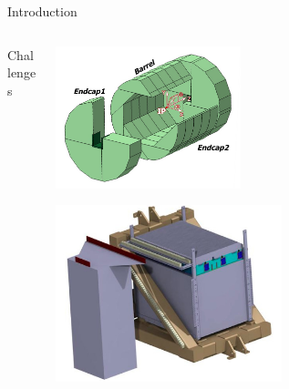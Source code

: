 \documentclass[10pt]{beamer}
\begin{document}
\begin{frame}[shrink=5]{Introduction}
\begin{columns}
\begin{column}{0.6\textwidth}
\begin{block}{\small  Challenges}
{        }
      \end{block}

    \end{column}

    \begin{column}{0.4\textwidth}
      \centerline{\includegraphics[width=0.45\textwidth]{jpg/IldDhcal}}
      \centerline{\includegraphics[width=0.55\textwidth]{jpg/DHCALProtoSchema}}
    \end{column}
  \end{columns}
\end{frame}
\end{document}
